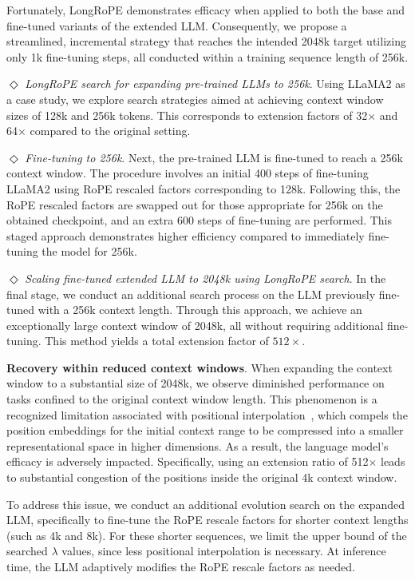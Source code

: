Fortunately, LongRoPE demonstrates efficacy when applied to both the base and fine-tuned variants of the extended LLM. Consequently, we propose a streamlined, incremental strategy that reaches the intended 2048k target utilizing only 1k fine-tuning steps, all conducted within a training sequence length of 256k.

$\Diamond$ \textit{LongRoPE search for expanding pre-trained LLMs to 256k}. Using LLaMA2 as a case study, we explore search strategies aimed at achieving context window sizes of 128k and 256k tokens. This corresponds to extension factors of 32$\times$ and 64$\times$ compared to the original setting.

$\Diamond$ \textit{Fine-tuning to 256k}. Next, the pre-trained LLM is fine-tuned to reach a 256k context window. The procedure involves an initial 400 steps of fine-tuning LLaMA2 using RoPE rescaled factors corresponding to 128k. Following this, the RoPE rescaled factors are swapped out for those appropriate for 256k on the obtained checkpoint, and an extra 600 steps of fine-tuning are performed. This staged approach demonstrates higher efficiency compared to immediately fine-tuning the model for 256k.

$\Diamond$ \textit{Scaling fine-tuned extended LLM to 2048k using LongRoPE search}. In the final stage, we conduct an additional search process on the LLM previously fine-tuned with a 256k context length. Through this approach, we achieve an exceptionally large context window of 2048k, all without requiring additional fine-tuning. This method yields a total extension factor of $512\times$.

\textbf{Recovery within reduced context windows}. When expanding the context window to a substantial size of 2048k, we observe diminished performance on tasks confined to the original context window length. This phenomenon is a recognized limitation associated with positional interpolation~\cite{pi}, which compels the position embeddings for the initial context range to be compressed into a smaller representational space in higher dimensions. As a result, the language model's efficacy is adversely impacted. Specifically, using an extension ratio of 512$\times$ leads to substantial congestion of the positions inside the original 4k context window.

To address this issue, we conduct an additional evolution search on the expanded LLM, specifically to fine-tune the RoPE rescale factors for shorter context lengths (such as 4k and 8k). For these shorter sequences, we limit the upper bound of the searched $\lambda$ values, since less positional interpolation is necessary. At inference time, the LLM adaptively modifies the RoPE rescale factors as needed.

